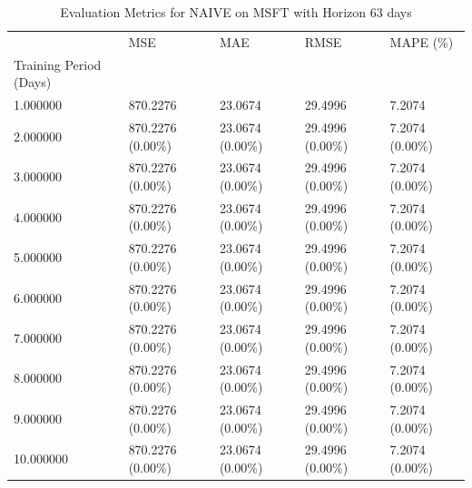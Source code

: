 \begin{table}
\caption{Evaluation Metrics for NAIVE on MSFT with Horizon 63 days}
\label{tab:naive_MSFT_h63_metrics}
\begin{tabular}{lllll}
\toprule
 & MSE & MAE & RMSE & MAPE (\%) \\
Training Period (Days) &  &  &  &  \\
\midrule
1.000000 & 870.2276 & 23.0674 & 29.4996 & 7.2074 \\
2.000000 & 870.2276 (0.00\%) & 23.0674 (0.00\%) & 29.4996 (0.00\%) & 7.2074 (0.00\%) \\
3.000000 & 870.2276 (0.00\%) & 23.0674 (0.00\%) & 29.4996 (0.00\%) & 7.2074 (0.00\%) \\
4.000000 & 870.2276 (0.00\%) & 23.0674 (0.00\%) & 29.4996 (0.00\%) & 7.2074 (0.00\%) \\
5.000000 & 870.2276 (0.00\%) & 23.0674 (0.00\%) & 29.4996 (0.00\%) & 7.2074 (0.00\%) \\
6.000000 & 870.2276 (0.00\%) & 23.0674 (0.00\%) & 29.4996 (0.00\%) & 7.2074 (0.00\%) \\
7.000000 & 870.2276 (0.00\%) & 23.0674 (0.00\%) & 29.4996 (0.00\%) & 7.2074 (0.00\%) \\
8.000000 & 870.2276 (0.00\%) & 23.0674 (0.00\%) & 29.4996 (0.00\%) & 7.2074 (0.00\%) \\
9.000000 & 870.2276 (0.00\%) & 23.0674 (0.00\%) & 29.4996 (0.00\%) & 7.2074 (0.00\%) \\
10.000000 & 870.2276 (0.00\%) & 23.0674 (0.00\%) & 29.4996 (0.00\%) & 7.2074 (0.00\%) \\
\bottomrule
\end{tabular}
\end{table}
